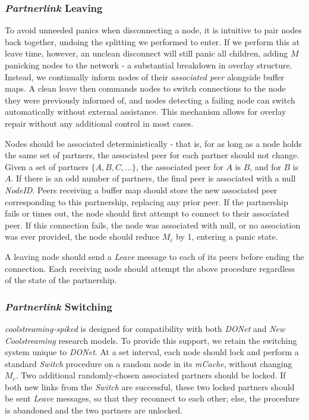 \documentclass[12pt,a4paper]{article}
\begin{document}
\subsubsection{\textit{Partnerlink} Leaving} \label{css:partnerlink:leaving}
To avoid unneeded panics when disconnecting a node, it is intuitive to pair nodes back together, undoing the splitting we performed to enter. If we perform this at leave time, however, an unclean disconnect will still panic all children, adding \(M\) panicking nodes to the network - a substantial breakdown in overlay structure. Instead, we continually inform nodes of their \textit{associated peer} alongside buffer maps. A clean leave then commands nodes to switch connections to the node they were previously informed of, and nodes detecting a failing node can switch automatically without external assistance. This mechanism allows for overlay repair without any additional control in most cases.

Nodes should be associated deterministically - that is, for as long as a node holds the same set of partners, the associated peer for each partner should not change. Given a set of partners \(\{A, B, C, ...\}\), the associated peer for \(A\) is \(B\), and for \(B\) is \(A\). If there is an odd number of partners, the final peer is associated with a null \textit{NodeID}. Peers receiving a buffer map should store the new associated peer corresponding to this partnership, replacing any prior peer. If the partnership fails or times out, the node should first attempt to connect to their associated peer. If this connection fails, the node was associated with null, or no association was ever provided, the node should reduce \(M_c\) by 1, entering a panic state.

A leaving node should send a \textit{Leave} message to each of its peers before ending the connection. Each receiving node should attempt the above procedure regardless of the state of the partnership.

\subsubsection{\textit{Partnerlink} Switching} \label{css:partnerlink:switching}
\textit{coolstreaming-spiked} is designed for compatibility with both \textit{DONet} and \textit{New Coolstreaming} research models. To provide this support, we retain the switching system unique to \textit{DONet}. At a set interval, each node should lock and perform a standard \textit{Switch} procedure on a random node in its \textit{mCache}, without changing \(M_c\). Two additional randomly-chosen associated partners should be locked. If both new links from the \textit{Switch} are successful, these two locked partners should be sent \textit{Leave} messages, so that they reconnect to each other; else, the procedure is abandoned and the two partners are unlocked.
\end{document}
